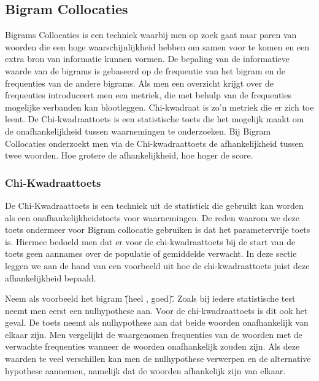 \subsection{Bigram Collocaties}\label{Bigram Collocaties}

Bigrams Collocaties is een techniek waarbij men op zoek gaat naar paren van woorden die een hoge waarschijnlijkheid hebben om samen voor te komen en een extra bron van informatie kunnen vormen. De bepaling van de informatieve waarde van de bigrams is gebaseerd op de frequentie van het bigram en de frequenties van de andere bigrams. Als men een overzicht krijgt over de frequenties introduceert men een metriek, die met behulp van de frequenties mogelijke verbanden kan blootleggen. Chi-kwadraat is zo'n metriek die er zich toe leent. De Chi-kwadraattoets is een statistische toets die het mogelijk maakt om de onafhankelijkheid tussen waarnemingen te onderzoeken. Bij Bigram Collocaties onderzoekt men via de Chi-kwadraattoets de afhankelijkheid tussen twee woorden. Hoe grotere de afhankelijkheid, hoe hoger de score.   

\subsubsection{Chi-Kwadraattoets}\label{Chi-Kwadraattoest}

De Chi-Kwadraattoets is een techniek uit de statistiek die gebruikt  kan worden als een onafhankelijkheidstoets voor waarnemingen. De reden waarom we deze toets ondermeer voor Bigram collocatie gebruiken is dat het parametervrije toets is. Hiermee bedoeld men dat er voor de chi-kwadraattoets bij de start van de toets geen aannames over de populatie of gemiddelde verwacht. In deze sectie leggen we aan de hand van een voorbeeld uit hoe de chi-kwadraattoets juist deze afhankelijkheid bepaald.

Neem als voorbeeld het bigram \"(heel , goed)\". Zoals bij iedere statistische test neemt men eerst een nulhypothese aan. Voor de chi-kwadraattoets is dit ook het geval. De toets neemt als nulhypothese aan dat beide woorden onafhankelijk van elkaar zijn. Men vergelijkt de waargenomen frequenties van de woorden met de verwachte frequenties wanneer de woorden onafhankelijk zouden zijn. Als deze waarden te veel verschillen kan men de nulhypothese verwerpen en de alternative hypothese aannemen, namelijk dat de woorden afhankelijk zijn van elkaar. 


